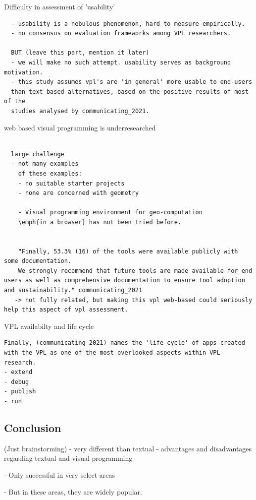 Difficulty in assessment of 'usability'
\begin{lstlisting}
  - usability is a nebulous phenomenon, hard to measure empirically.
  - no consensus on evaluation frameworks among VPL researchers. 

  BUT (leave this part, mention it later)
  - we will make no such attempt. usability serves as background motivation. 
  - this study assumes vpl's are 'in general' more usable to end-users 
  than text-based alternatives, based on the positive results of most of the 
  studies analysed by communicating_2021.   
\end{lstlisting}

web based visual programming is underresearched
\begin{lstlisting}
  
  large challenge
  - not many examples
    of these examples: 
    - no suitable starter projects
    - none are concerned with geometry

    - Visual programming environment for geo-computation 
    \emph{in a browser} has not been tried before. 


    "Finally, 53.3% (16) of the tools were available publicly with some documentation. 
    We strongly recommend that future tools are made available for end users as well as comprehensive documentation to ensure tool adoption and sustainability." communicating_2021 
   -> not fully related, but making this vpl web-based could seriously help this aspect of vpl assessment.   

\end{lstlisting}

VPL availabilty and life cycle
\begin{lstlisting}
Finally, (communicating_2021) names the 'life cycle' of apps created 
with the VPL as one of the most overlooked aspects within VPL research. 
- extend 
- debug
- publish
- run
\end{lstlisting}

\subsection{Conclusion}

(Just brainstorming)
- very different than textual 
- advantages and disadvantages regarding textual and visual programming

- Only successful in very select areas


- But in these areas, they are widely popular.


